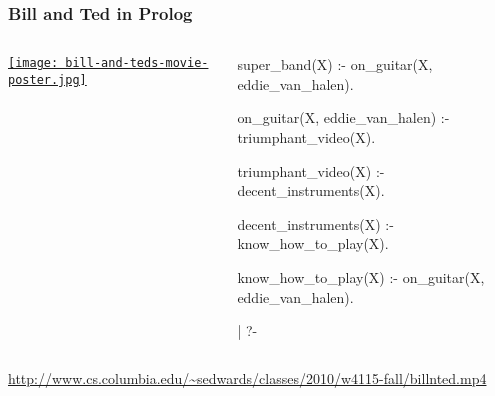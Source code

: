 \documentclass{plt}
\begin{document}
\begin{frame}[fragile]
  \frametitle{Bill and Ted in Prolog}

\begin{columns}
  \begin{column}{0.4\textwidth}
\href{http://www.cs.columbia.edu/~sedwards/classes/2010/w4115-fall/billnted.mp4}{\texttt{[image: bill-and-teds-movie-poster.jpg]}}
  \end{column}
  \begin{column}{0.5\textwidth}

\begin{prolog}
super_band(X) :-
   on_guitar(X, eddie_van_halen).

on_guitar(X, eddie_van_halen) :-
   triumphant_video(X).

triumphant_video(X) :-
   decent_instruments(X).

decent_instruments(X) :-
   know_how_to_play(X).

know_how_to_play(X) :-
   on_guitar(X, eddie_van_halen).
\end{prolog}

\begin{interactive}
| ?- 
\end{interactive}


  \end{column}
\end{columns}

{\footnotesize
\url{http://www.cs.columbia.edu/~sedwards/classes/2010/w4115-fall/billnted.mp4}}

\end{frame}
\end{document}
